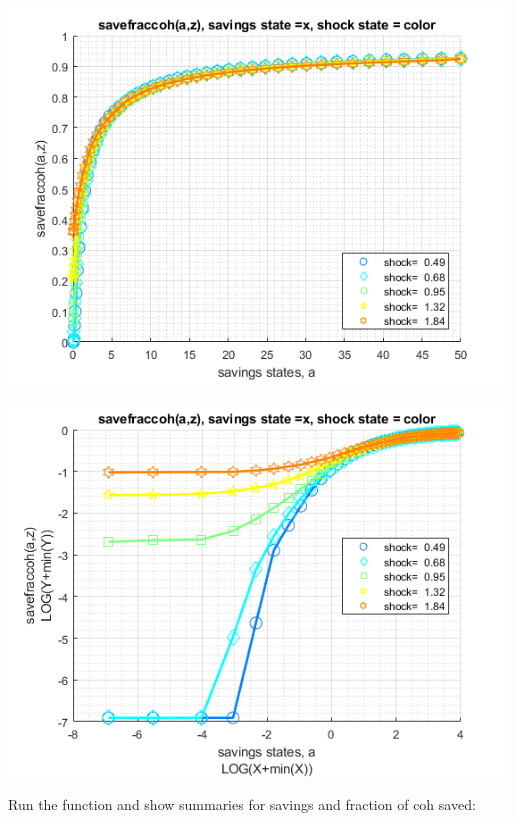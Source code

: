 \documentclass[
]{book}
\begin{document}
\includegraphics[width=5.20833in,height=\textheight]{img/fx_vfi_az_mzoom_loop_images/figure_0.png}

\includegraphics[width=5.20833in,height=\textheight]{img/fx_vfi_az_mzoom_loop_images/figure_1.png}

Run the function and show summaries for savings and fraction of coh
saved:
\end{document}
